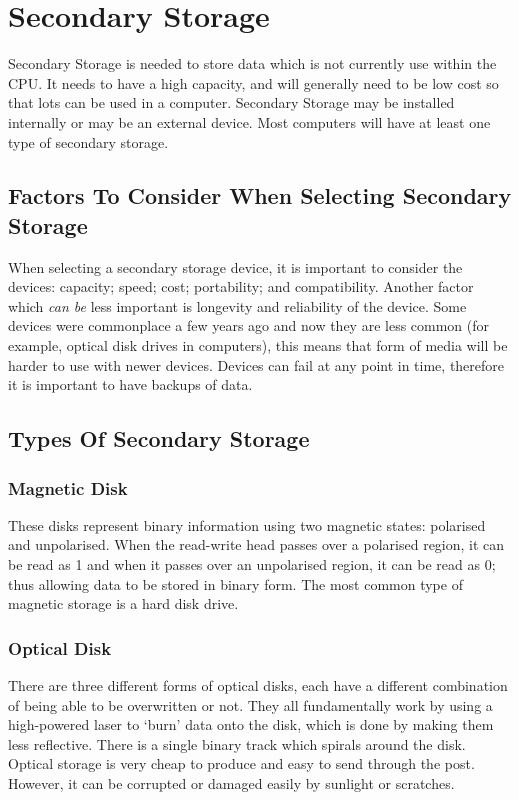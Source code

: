 \documentclass[a4paper,11pt, twocolumn]{article}
\begin{document}
\section{Secondary Storage}
Secondary Storage is needed to store data which is not currently use within the CPU. It needs to have a high capacity, and will generally need to be low cost so that lots can be used in a computer. Secondary Storage may be installed internally or may be an external device. Most computers will have at least one type of secondary storage. 
\subsection{Factors To Consider When Selecting Secondary Storage}
When selecting a secondary storage device, it is important to consider the devices: capacity; speed; cost; portability; and compatibility. Another factor which \textit{can be }less important is longevity and reliability of the device. Some devices were commonplace a few years ago and now they are less common (for example, optical disk drives in computers), this means that form of media will be harder to use with newer devices. Devices can fail at any point in time, therefore it is important to have backups of data. 
\subsection{Types Of Secondary Storage}
\subsubsection{Magnetic Disk}
These disks represent binary information using two magnetic states: polarised and unpolarised. When the read-write head passes over a polarised region, it can be read as 1 and when it passes over an unpolarised region, it can be read as 0; thus allowing data to be stored in binary form. The most common type of magnetic storage is a hard disk drive. 
\subsubsection{Optical Disk}
There are three different forms of optical disks, each have a different combination of being able to be overwritten or not. They all fundamentally work by using a high-powered laser to `burn' data onto the disk, which is done by making them less reflective. There is a single binary track which spirals around the disk. Optical storage is very cheap to produce and easy to send through the post. However, it can be corrupted or damaged easily by sunlight or scratches.
\end{document}
